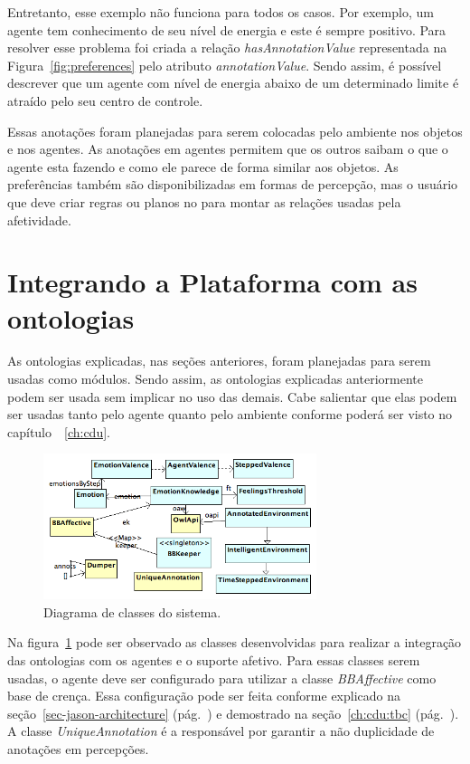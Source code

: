 Entretanto, esse exemplo não funciona para todos os casos. Por exemplo, um
agente tem conhecimento de seu nível de energia e este é sempre positivo. Para
resolver esse problema foi criada a relação \emph{hasAnnotationValue}
representada na Figura~\ref{fig:preferences} pelo atributo
\emph{annotationValue}. Sendo assim, é possível descrever que um agente com
nível de energia abaixo de um determinado limite é atraído pelo seu centro de
controle.

Essas anotações foram planejadas para serem colocadas pelo ambiente
nos objetos e nos agentes. As anotações em agentes permitem que os outros saibam
o que o agente esta fazendo e como ele parece de forma similar aos objetos. As
preferências também são disponibilizadas em formas de percepção, mas o usuário
que deve criar regras ou planos no \jason para montar as relações usadas pela
afetividade.

\section{Integrando a Plataforma \jason com as ontologias} \label{ch:p:ipjo}

As ontologias explicadas, nas seções anteriores, foram planejadas para serem
usadas como módulos. Sendo assim, as ontologias explicadas anteriormente
podem ser usada sem implicar no uso das demais. Cabe salientar que elas podem ser
usadas tanto pelo agente quanto pelo ambiente conforme poderá ser visto no
capítulo~~\ref{ch:cdu}.

\begin{figure}[b]
  \centering
  \includegraphics[width=8cm]{figuras/implementacao-15dez2011.png}
  \caption{Diagrama de classes do sistema.}
  \label{fig:dcs}
\end{figure}

Na figura~\ref{fig:dcs} pode ser observado as classes desenvolvidas para
realizar a integração das ontologias com os agentes \jason e o suporte
afetivo. Para essas classes serem usadas, o agente deve ser configurado para
utilizar a classe \emph{BBAffective} como base de crença. Essa configuração
pode ser feita conforme explicado na seção~\ref{sec-jason-architecture}
(pág.~\pageref{sec-jason-architecture}) e demostrado na seção~\ref{ch:cdu:tbc}
(pág.~\pageref{ch:cdu:tbc}). A classe \emph{UniqueAnnotation} é a responsável
por garantir a não duplicidade de anotações em percepções. %

